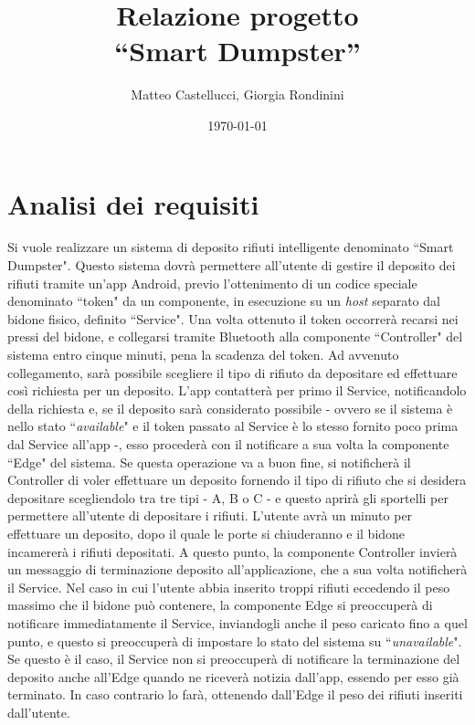 \documentclass[a4paper, 12pt]{report}
\title{Relazione progetto\\``Smart Dumpster''}
\author{Matteo Castellucci, Giorgia Rondinini}
\date{\today}
\begin{document}
	\maketitle
	\tableofcontents
	\chapter{Analisi dei requisiti}
	Si vuole realizzare un sistema di deposito rifiuti intelligente denominato ``Smart Dumpster".\newline
	Questo sistema dovrà permettere all'utente di gestire il deposito dei rifiuti tramite un'app Android,
	previo l'ottenimento di un codice speciale denominato ``token" da un componente, in esecuzione su un
	\textit{host} separato dal bidone fisico, definito ``Service". Una volta ottenuto il token occorrerà
	recarsi nei pressi del bidone, e collegarsi tramite Bluetooth alla componente ``Controller" del
	sistema entro cinque minuti, pena la scadenza del token. Ad avvenuto collegamento, sarà
	possibile scegliere il tipo di rifiuto da depositare ed
	effettuare così richiesta per un deposito. L'app contatterà per primo il Service, notificandolo della
	richiesta e, se il deposito sarà considerato possibile - ovvero se il sistema è nello stato ``\textit{available}"
	e il token passato al Service è lo stesso fornito poco prima dal Service all'app -, esso procederà
	con il notificare a sua volta la componente ``Edge" del sistema. Se questa operazione va a buon fine, 
	si notificherà il Controller di voler effettuare un deposito fornendo il tipo di rifiuto che si
	desidera depositare scegliendolo tra tre tipi - A, B o C - e questo aprirà gli sportelli per permettere
	all'utente di depositare i rifiuti. L'utente
	avrà un minuto per effettuare un deposito, dopo il quale le porte si chiuderanno e il bidone
	incamererà i rifiuti depositati. A questo punto, la componente Controller invierà un messaggio di
	terminazione deposito all'applicazione, che a sua volta notificherà il Service. Nel caso in cui
	l'utente abbia inserito troppi rifiuti eccedendo il peso massimo che il bidone può contenere, la
	componente Edge si preoccuperà di notificare immediatamente il Service, inviandogli anche il peso caricato fino a
	quel punto, e questo si preoccuperà di impostare lo stato del sistema su ``\textit{unavailable}". Se questo è
	il caso, il Service non si preoccuperà di notificare la terminazione del deposito anche all'Edge 
	quando ne riceverà notizia dall'app,
	essendo per esso già terminato. In caso contrario lo farà, ottenendo dall'Edge il peso dei rifiuti
	inseriti dall'utente.\newline
\end{document}
